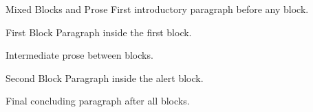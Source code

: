 \documentclass[14pt,t]{beamer-accessibility}
\begin{document}
\begin{frame}{Mixed Blocks and Prose}
First introductory paragraph before any block.

\begin{block}{First Block}
Paragraph inside the first block.
\end{block}

Intermediate prose between blocks.

\begin{alertblock}{Second Block}
Paragraph inside the alert block.
\end{alertblock}

Final concluding paragraph after all blocks.
\end{frame}
\end{document}
